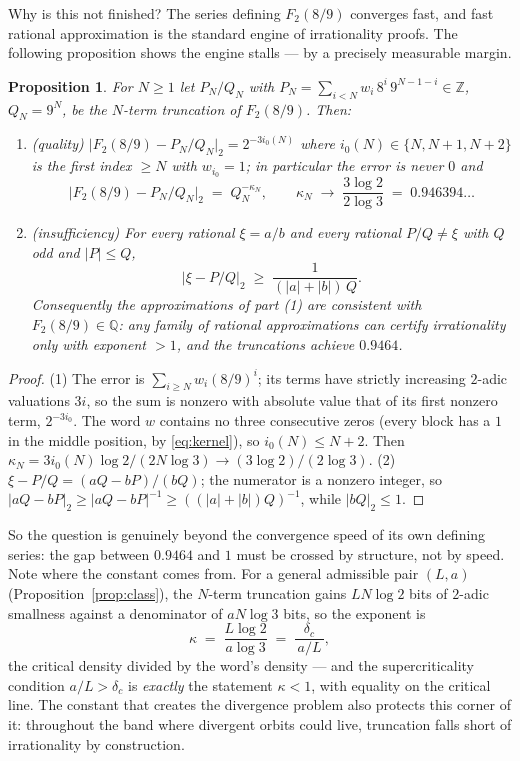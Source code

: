 \documentclass[11pt]{article}
\newtheorem{proposition}[theorem]{Proposition}
\theoremstyle{definition}
\newcommand{\Z}{\mathbb{Z}}
\newcommand{\Q}{\mathbb{Q}}
\begin{document}
Why is this not finished? The series defining $F_2(8/9)$ converges
fast, and fast rational approximation is the standard engine of
irrationality proofs. The following proposition shows the engine
stalls --- by a precisely measurable margin.

\begin{proposition}\label{prop:gap}
For $N \ge 1$ let $P_N/Q_N$ with
$P_N = \sum_{i<N} w_i\, 8^i\, 9^{N-1-i} \in \Z$, $Q_N = 9^N$, be the
$N$-term truncation of $F_2(8/9)$. Then:
\begin{enumerate}
\item (quality) $\bigl|F_2(8/9) - P_N/Q_N\bigr|_2 = 2^{-3 i_0(N)}$
where $i_0(N) \in \{N, N+1, N+2\}$ is the first index $\ge N$ with
$w_{i_0} = 1$; in particular the error is never $0$ and
\[
\bigl|F_2(8/9) - P_N/Q_N\bigr|_2
\;=\; Q_N^{-\kappa_N}, \qquad
\kappa_N \;\to\; \frac{3\log 2}{2 \log 3} \;=\; 0.946394\ldots
\]
\item (insufficiency) For every rational $\xi = a/b$ and every
rational $P/Q \neq \xi$ with $Q$ odd and $|P| \le Q$,
\[
\bigl|\xi - P/Q\bigr|_2 \;\ge\; \frac{1}{(|a| + |b|)\, Q}.
\]
Consequently the approximations of part (1) are consistent with
$F_2(8/9) \in \Q$: any family of rational approximations can certify
irrationality only with exponent $> 1$, and the truncations achieve
$0.9464$.
\end{enumerate}
\end{proposition}

\begin{proof}
(1) The error is $\sum_{i \ge N} w_i (8/9)^i$; its terms have
strictly increasing $2$-adic valuations $3i$, so the sum is nonzero
with absolute value that of its first nonzero term, $2^{-3 i_0}$. The
word $w$ contains no three consecutive zeros (every block has a $1$ in
the middle position, by \eqref{eq:kernel}), so $i_0(N) \le N + 2$.
Then $\kappa_N = 3 i_0(N) \log 2 / (2N \log 3) \to (3\log2)/(2\log3)$.
(2) $\xi - P/Q = (aQ - bP)/(bQ)$; the numerator is a nonzero integer,
so $|aQ - bP|_2 \ge |aQ - bP|^{-1} \ge ((|a|+|b|)Q)^{-1}$, while
$|bQ|_2 \le 1$.
\end{proof}

So the question is genuinely beyond the convergence speed of its own
defining series: the gap between $0.9464$ and $1$ must be crossed by
structure, not by speed. Note where the constant comes from. For a
general admissible pair $(L, a)$ (Proposition~\ref{prop:class}), the
$N$-term truncation gains $LN \log 2$ bits of $2$-adic smallness
against a denominator of $aN \log 3$ bits, so the exponent is
\[
\kappa \;=\; \frac{L \log 2}{a \log 3}
\;=\; \frac{\delta_c}{\,a/L\,},
\]
the critical density divided by the word's density --- and the
supercriticality condition $a/L > \delta_c$ is \emph{exactly} the
statement $\kappa < 1$, with equality on the critical line. The
constant that creates the divergence problem also protects this
corner of it: throughout the band where divergent orbits could live,
truncation falls short of irrationality by construction.
\end{document}
